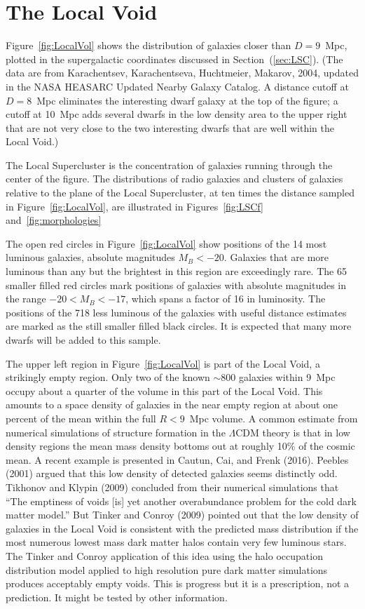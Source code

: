 \documentclass[fleqn,12pt]{article}
\begin{document}
\section{The Local Void}\label{sec:localvoid} 

Figure~\ref{fig:LocalVol} shows the distribution of galaxies closer than $D=9$~Mpc, plotted in the supergalactic coordinates discussed in Section~(\ref{sec:LSC}). (The data are from Karachentsev, Karachentseva, Huchtmeier, Makarov, 2004, updated in the NASA HEASARC Updated Nearby Galaxy Catalog. A distance cutoff at $D=8$~Mpc eliminates the interesting dwarf galaxy at the top of the figure; a cutoff at 10~Mpc adds several dwarfs in the low density area to the upper right that are not very close to the two interesting dwarfs that are well within the Local Void.) 

The Local Supercluster is the  concentration of galaxies running through the center of the figure. The distributions of radio galaxies and clusters of galaxies relative to the plane of the Local Supercluster, at ten times the distance sampled in Figure~\ref{fig:LocalVol}, are illustrated in Figures~\ref{fig:LSCf} and~\ref{fig:morphologies}

The open red circles in Figure~\ref{fig:LocalVol} show positions of the 14 most luminous galaxies, absolute magnitudes $M_B<-20$. Galaxies that are more luminous than any but the brightest in this region are exceedingly rare. The 65 smaller filled red circles mark positions of galaxies with absolute magnitudes in the range $-20 < M_B < -17$, which spans a factor of 16 in luminosity. The positions of the 718 less luminous of the galaxies with useful distance estimates are marked as the still smaller filled black circles. It is expected that many more dwarfs will be added to this sample.

The upper left region in Figure~\ref{fig:LocalVol} is part of the Local Void, a strikingly empty region. Only two of the known $\sim 800$ galaxies within 9~Mpc occupy about a quarter of the volume in this part of the Local Void. This amounts to a space density of galaxies in the near empty region at about one percent of the mean within the full $R<9$~Mpc volume. A common estimate from numerical simulations of structure formation in the $\Lambda$CDM theory is that in low density regions the mean mass density bottoms out at roughly 10\% of the cosmic mean. A recent example is presented in Cautun, Cai, and Frenk (2016). Peebles (2001) argued that this low density of detected galaxies seems distinctly odd. Tikhonov and Klypin (2009) concluded from their numerical simulations that  ``The emptiness of voids [is] yet another overabundance problem for the cold dark matter model.'' But Tinker and Conroy (2009) pointed out that the low density of galaxies in the Local Void is consistent with the predicted mass distribution if the most numerous lowest mass dark matter halos contain very few luminous stars. The Tinker and Conroy application of this idea using the halo occupation distribution model applied to high resolution pure dark matter simulations produces acceptably empty voids. This is progress but it is a prescription, not a prediction. It might be tested by other information. 
\end{document}
